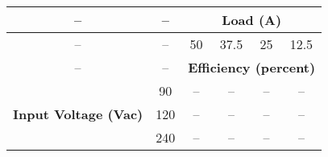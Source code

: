 \begin{tabular}{|c|c|c|c|c|c|}
\hline
-- & -- & \multicolumn{4}{|c|}{\textbf{Load (A)}} \\
\hline
-- & -- & 50 & 37.5 & 25 & 12.5 \\
-- & -- & \multicolumn{4}{|c|}{\textbf{Efficiency (percent)}} \\
\hline
\multirow{3}{*}{\textbf{Input Voltage (Vac)}} & 90 & -- & -- & -- & -- \\
 & 120 & -- & -- & -- & -- \\
 & 240 & -- & -- & -- & -- \\
\hline
\end{tabular}